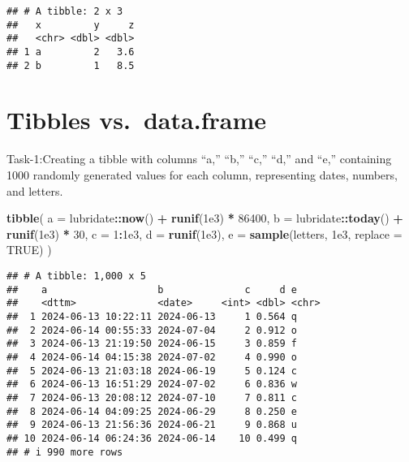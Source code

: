 \documentclass[
]{article}
\newenvironment{Shaded}{\begin{snugshade}}{\end{snugshade}}
\newcommand{\AttributeTok}[1]{\textcolor[rgb]{0.13,0.29,0.53}{#1}}
\newcommand{\ConstantTok}[1]{\textcolor[rgb]{0.56,0.35,0.01}{#1}}
\newcommand{\DecValTok}[1]{\textcolor[rgb]{0.00,0.00,0.81}{#1}}
\newcommand{\FloatTok}[1]{\textcolor[rgb]{0.00,0.00,0.81}{#1}}
\newcommand{\FunctionTok}[1]{\textcolor[rgb]{0.13,0.29,0.53}{\textbf{#1}}}
\newcommand{\NormalTok}[1]{#1}
\newcommand{\SpecialCharTok}[1]{\textcolor[rgb]{0.81,0.36,0.00}{\textbf{#1}}}
\begin{document}
\begin{verbatim}
## # A tibble: 2 x 3
##   x         y     z
##   <chr> <dbl> <dbl>
## 1 a         2   3.6
## 2 b         1   8.5
\end{verbatim}

\hypertarget{tibbles-vs.-data.frame}{%
\section{Tibbles vs.~data.frame}\label{tibbles-vs.-data.frame}}

Task-1:Creating a tibble with columns ``a,'' ``b,'' ``c,'' ``d,'' and
``e,'' containing 1000 randomly generated values for each column,
representing dates, numbers, and letters.

\begin{Shaded}
\begin{Highlighting}[]
\FunctionTok{tibble}\NormalTok{(}
  \AttributeTok{a =}\NormalTok{ lubridate}\SpecialCharTok{::}\FunctionTok{now}\NormalTok{() }\SpecialCharTok{+} \FunctionTok{runif}\NormalTok{(}\FloatTok{1e3}\NormalTok{) }\SpecialCharTok{*} \DecValTok{86400}\NormalTok{,}
  \AttributeTok{b =}\NormalTok{ lubridate}\SpecialCharTok{::}\FunctionTok{today}\NormalTok{() }\SpecialCharTok{+} \FunctionTok{runif}\NormalTok{(}\FloatTok{1e3}\NormalTok{) }\SpecialCharTok{*} \DecValTok{30}\NormalTok{,}
  \AttributeTok{c =} \DecValTok{1}\SpecialCharTok{:}\FloatTok{1e3}\NormalTok{,}
  \AttributeTok{d =} \FunctionTok{runif}\NormalTok{(}\FloatTok{1e3}\NormalTok{),}
  \AttributeTok{e =} \FunctionTok{sample}\NormalTok{(letters, }\FloatTok{1e3}\NormalTok{, }\AttributeTok{replace =} \ConstantTok{TRUE}\NormalTok{)}
\NormalTok{)}
\end{Highlighting}
\end{Shaded}

\begin{verbatim}
## # A tibble: 1,000 x 5
##    a                   b              c     d e    
##    <dttm>              <date>     <int> <dbl> <chr>
##  1 2024-06-13 10:22:11 2024-06-13     1 0.564 q    
##  2 2024-06-14 00:55:33 2024-07-04     2 0.912 o    
##  3 2024-06-13 21:19:50 2024-06-15     3 0.859 f    
##  4 2024-06-14 04:15:38 2024-07-02     4 0.990 o    
##  5 2024-06-13 21:03:18 2024-06-19     5 0.124 c    
##  6 2024-06-13 16:51:29 2024-07-02     6 0.836 w    
##  7 2024-06-13 20:08:12 2024-07-10     7 0.811 c    
##  8 2024-06-14 04:09:25 2024-06-29     8 0.250 e    
##  9 2024-06-13 21:56:36 2024-06-21     9 0.868 u    
## 10 2024-06-14 06:24:36 2024-06-14    10 0.499 q    
## # i 990 more rows
\end{verbatim}
\end{document}
